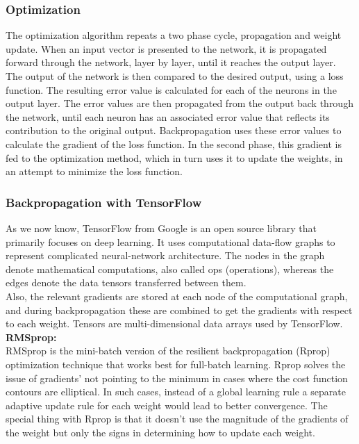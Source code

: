       \subsubsection{Optimization}
      The optimization algorithm repeats a two phase cycle, propagation and weight update. When an input vector is presented to the network, it is propagated forward through the network, layer by layer, until it reaches the output layer. The output of the network is then compared to the desired output, using a loss function. The resulting error value is calculated for each of the neurons in the output layer. The error values are then propagated from the output back through the network, until each neuron has an associated error value that reflects its contribution to the original output.
Backpropagation uses these error values to calculate the gradient of the loss function. In the second phase, this gradient is fed to the optimization method, which in turn uses it to update the weights, in an attempt to minimize the loss function.
\subsubsection{Backpropagation with TensorFlow}
As we now know, TensorFlow from Google is an open source library that primarily focuses on deep learning. It uses computational data-flow graphs to represent complicated neural-network architecture. The nodes in the graph denote mathematical computations, also called ops (operations), whereas the edges denote the data tensors transferred between them.\\
Also, the relevant gradients are stored at each node of the computational graph, and during backpropagation these are combined to get the gradients with respect to each weight. Tensors are multi-dimensional data arrays used by TensorFlow.\\

\textbf{RMSprop:}\\
RMSprop is the mini-batch version of the resilient backpropagation (Rprop) optimization technique that works best for full-batch learning. Rprop solves the issue of gradients’ not pointing to the minimum in cases where the cost function contours are elliptical. In such cases, instead of a global learning rule a separate adaptive update rule for each weight would lead to better convergence. The special thing with Rprop is that it doesn’t use the magnitude of the gradients of the weight but only the signs in determining how to update each weight.\\


  



 
  


      
  


